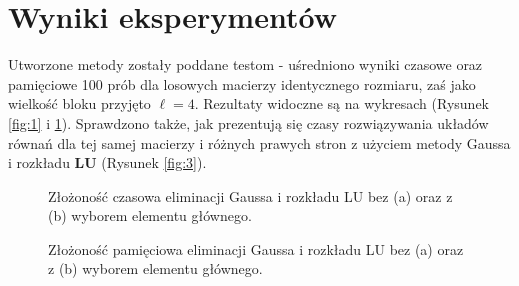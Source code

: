 \documentclass{classrep}
\newcommand{\mL}{\bm{L}}
\newcommand{\mU}{\bm{U}}
\begin{document}
\section{Wyniki eksperymentów}	
	Utworzone metody zostały poddane testom - uśredniono wyniki czasowe oraz pamięciowe 100 prób dla losowych macierzy identycznego rozmiaru, zaś jako wielkość bloku przyjęto $\ell=4$. Rezultaty widoczne są na wykresach (Rysunek \ref{fig:1} i \ref{fig:2}). Sprawdzono także, jak prezentują się czasy rozwiązywania układów równań dla tej samej macierzy i różnych prawych stron z użyciem metody Gaussa i rozkładu $\mL\mU$ (Rysunek \ref{fig:3}).
	\begin{figure}[!h]
	
		 \hfill
		\caption{Złożoność czasowa eliminacji Gaussa i rozkładu LU bez (a) oraz z (b) wyborem elementu głównego.}  
		\label{fig:1} 
		
		\centering
		 \hfill
		\caption{Złożoność pamięciowa eliminacji Gaussa i rozkładu LU bez (a) oraz z (b) wyborem elementu głównego.}
		\label{fig:2}
		

\end{figure}
\end{document}
